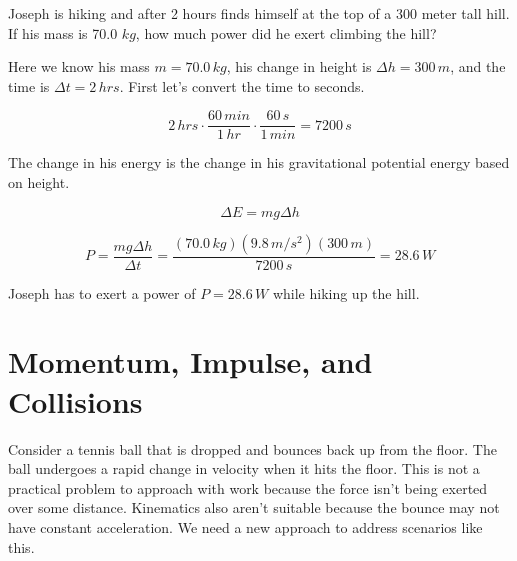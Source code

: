 \documentclass[12pt]{book}
\begin{document}
\begin{exampleblock}

Joseph is hiking and after 2 hours finds himself at the top of a 300 meter tall hill. If his mass is 70.0 $kg$, how much power did he exert climbing the hill?

\hspace{10pt}

Here we know his mass $m = 70.0 \, kg$, his change in height is $\Delta h = 300 \, m$, and the time is $\Delta t = 2 \, hrs$. First let's convert the time to seconds.

\begin{equation}
2 \, hrs \cdot \frac{60 \, min}{1 \, hr} \cdot \frac{60 \, s}{1 \, min} = 7200 \, s
\end{equation}

The change in his energy is the change in his gravitational potential energy based on height.

\begin{equation}
\Delta E = mg \Delta h
\end{equation}

\begin{equation}
P = \frac{mg \Delta h}{\Delta t} = \frac{(70.0 \, kg) (9.8 \, m/s^2) (300 \, m)}{7200 \, s} = 28.6 \, W
\end{equation}

Joseph has to exert a power of $P = 28.6 \, W$ while hiking up the hill.

\end{exampleblock}


\chapter{Momentum, Impulse, and Collisions}
\setcounter{example}{1}
\addtocounter{chp}{1}

Consider a tennis ball that is dropped and bounces back up from the floor. The ball undergoes a rapid change in velocity when it hits the floor. This is not a practical problem to approach with work because the force isn't being exerted over some distance. Kinematics also aren't suitable because the bounce may not have constant acceleration. We need a new approach to address scenarios like this.
\end{document}

